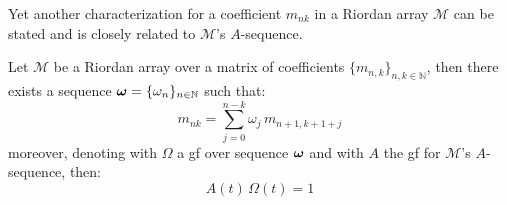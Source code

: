 Yet another characterization for a coefficient $m_{nk}$ in a Riordan array $\mathcal{M}$
can be stated and is closely related to $\mathcal{M}$'s $A$-sequence.
\begin{theorem}
    Let $\mathcal{M}$ be a Riordan array over a matrix of coefficients
    $\lbrace m_{n,k}\rbrace_{n,k\in\mathbb{N}}$, then there exists a sequence
    $\boldsymbol{\omega}=\lbrace \omega_{n}\rbrace_{n\in\mathbb{N}}$ such that:
    \begin{displaymath}
        m_{nk}=\sum_{j=0}^{n-k}{\omega_{j}\,m_{n+1,k+1+j}}
    \end{displaymath}
    moreover, denoting with $\Omega$ a \ac{gf} over sequence $\boldsymbol{\omega}$ and
    with $A$ the \ac{gf} for $\mathcal{M}$'s $A$-sequence, then:
    \begin{displaymath}
        A(t)\,\Omega(t)=1
    \end{displaymath}
\end{theorem}
